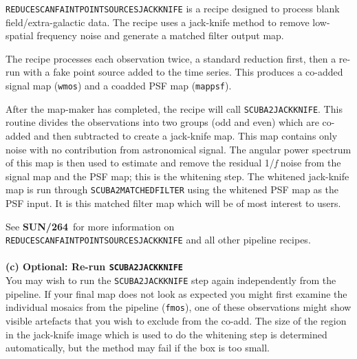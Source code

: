\documentclass[twoside,11pt]{article}
\newcommand{\htmladdnormallink}[2]{#1}
\newcommand{\xref}[3]{#1}
\renewcommand{\_}{\texttt{\symbol{95}}}
\newcommand{\drrecipe}[1]{\texttt{#1}}
\newcommand{\file}[1]{\texttt{#1}}
\newcommand{\pipelinesun}{\xref{\textbf{SUN/264}}{sun264}{}}
\begin{document}
\drrecipe{REDUCE\_SCAN\_FAINT\_POINT\_SOURCES\_JACKKNIFE} is a recipe designed to
process blank field/extra-galactic data. The recipe uses a
\htmladdnormallink{jack-knife}{http://en.wikipedia.org/wiki/Jackknife_resampling}
method to remove low-spatial frequency noise and generate a matched
filter output map.

The recipe processes each observation twice, a standard reduction
first, then a re-run with a fake point source added to the time
series. This produces a co-added signal map (\file{\_wmos}) and a
coadded PSF map (\file{\_mappsf}).

After the map-maker has completed, the recipe will call
\xref{\drrecipe{SCUBA2\_JACKKNIFE}}{sun265}{SCUBA2_JACKKNIFE}. This
routine divides the observations into two groups (odd and even) which
are co-added and then subtracted to create a jack-knife map. This map
contains only noise with no contribution from astronomical signal. The
angular power spectrum of this map is then used to estimate and remove
the residual 1/\emph{f} noise from the signal map and the PSF map;
this is the whitening step. The whitened jack-knife map is run through
\xref{\drrecipe{SCUBA2\_MATCHED\_FILTER}}{sun265}{SCUBA2_MATCHED_FILTER}
using the whitened PSF map as the PSF input. It is this matched filter
map which will be of most interest to users.

See \pipelinesun\ for more information on
\drrecipe{REDUCE\_SCAN\_FAINT\_POINT\_SOURCES\_JACKKNIFE} and all other pipeline
recipes.
\\ \\
\textbf{(c) Optional: Re-run \drrecipe{SCUBA2\_JACKKNIFE}}\\
You may wish to run the \drrecipe{SCUBA2\_JACKKNIFE} step again
independently from the pipeline. If your final map does not look as
expected you might first examine the individual mosaics from the
pipeline (\file{\_fmos}), one of these observations might show visible
artefacts that you wish to exclude from the co-add. The size of the
region in the jack-knife image which is used to do the whitening step
is determined automatically, but the method may fail if the box is too
small.
\end{document}
